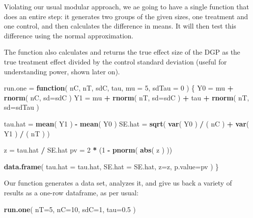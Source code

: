 \documentclass[
]{book}
\newenvironment{Shaded}{\begin{snugshade}}{\end{snugshade}}
\newcommand{\AttributeTok}[1]{\textcolor[rgb]{0.13,0.29,0.53}{#1}}
\newcommand{\ControlFlowTok}[1]{\textcolor[rgb]{0.13,0.29,0.53}{\textbf{#1}}}
\newcommand{\DecValTok}[1]{\textcolor[rgb]{0.00,0.00,0.81}{#1}}
\newcommand{\FloatTok}[1]{\textcolor[rgb]{0.00,0.00,0.81}{#1}}
\newcommand{\FunctionTok}[1]{\textcolor[rgb]{0.13,0.29,0.53}{\textbf{#1}}}
\newcommand{\NormalTok}[1]{#1}
\newcommand{\OtherTok}[1]{\textcolor[rgb]{0.56,0.35,0.01}{#1}}
\newcommand{\SpecialCharTok}[1]{\textcolor[rgb]{0.81,0.36,0.00}{\textbf{#1}}}
\begin{document}
Violating our usual modular approach, we ae going to have a single function that does an entire step: it generates two groups of the given sizes, one treatment and
one control, and then calculates the difference in means. It will then test
this difference using the normal approximation.

The function also calculates and returns the true effect size of the DGP as the true treatment
effect divided by the control standard deviation (useful for understanding
power, shown later on).

\begin{Shaded}
\begin{Highlighting}[]
\NormalTok{run.one }\OtherTok{=} \ControlFlowTok{function}\NormalTok{( nC, nT, sdC, tau, }\AttributeTok{mu =} \DecValTok{5}\NormalTok{, }\AttributeTok{sdTau =} \DecValTok{0}\NormalTok{ ) \{}
\NormalTok{  Y0 }\OtherTok{=}\NormalTok{ mu }\SpecialCharTok{+} \FunctionTok{rnorm}\NormalTok{( nC, }\AttributeTok{sd=}\NormalTok{sdC )}
\NormalTok{  Y1 }\OtherTok{=}\NormalTok{ mu }\SpecialCharTok{+} \FunctionTok{rnorm}\NormalTok{( nT, }\AttributeTok{sd=}\NormalTok{sdC ) }\SpecialCharTok{+}\NormalTok{ tau }\SpecialCharTok{+} \FunctionTok{rnorm}\NormalTok{( nT, }\AttributeTok{sd=}\NormalTok{sdTau )}

\NormalTok{  tau.hat }\OtherTok{=} \FunctionTok{mean}\NormalTok{( Y1 ) }\SpecialCharTok{{-}} \FunctionTok{mean}\NormalTok{( Y0 )}
\NormalTok{  SE.hat }\OtherTok{=} \FunctionTok{sqrt}\NormalTok{( }\FunctionTok{var}\NormalTok{( Y0 ) }\SpecialCharTok{/}\NormalTok{ ( nC ) }\SpecialCharTok{+} \FunctionTok{var}\NormalTok{( Y1 ) }\SpecialCharTok{/}\NormalTok{ ( nT ) )}

\NormalTok{  z }\OtherTok{=}\NormalTok{ tau.hat }\SpecialCharTok{/}\NormalTok{ SE.hat}
\NormalTok{  pv }\OtherTok{=} \DecValTok{2} \SpecialCharTok{*}\NormalTok{ (}\DecValTok{1} \SpecialCharTok{{-}} \FunctionTok{pnorm}\NormalTok{( }\FunctionTok{abs}\NormalTok{( z ) ))}

  \FunctionTok{data.frame}\NormalTok{( }\AttributeTok{tau.hat =}\NormalTok{ tau.hat, }\AttributeTok{SE.hat =}\NormalTok{ SE.hat, }\AttributeTok{z=}\NormalTok{z, }\AttributeTok{p.value=}\NormalTok{pv )}
\NormalTok{\}}
\end{Highlighting}
\end{Shaded}

Our function generates a data set, analyzes it, and give us back a variety
of results as a one-row dataframe, as per usual:

\begin{Shaded}
\begin{Highlighting}[]
\FunctionTok{run.one}\NormalTok{( }\AttributeTok{nT=}\DecValTok{5}\NormalTok{, }\AttributeTok{nC=}\DecValTok{10}\NormalTok{, }\AttributeTok{sdC=}\DecValTok{1}\NormalTok{, }\AttributeTok{tau=}\FloatTok{0.5}\NormalTok{ )}
\end{Highlighting}
\end{Shaded}
\end{document}
